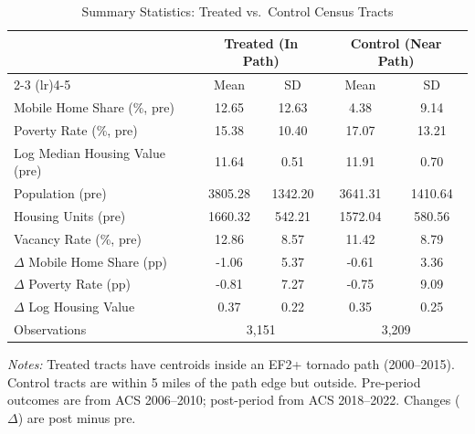 \begin{table}[t]
\centering
\caption{Summary Statistics: Treated vs.\ Control Census Tracts}
\label{tab:summary}
\begin{tabular}{lcccc}
\hline\hline
 & \multicolumn{2}{c}{Treated (In Path)} & \multicolumn{2}{c}{Control (Near Path)} \\
\cmidrule(lr){2-3} \cmidrule(lr){4-5}
 & Mean & SD & Mean & SD \\
\hline
Mobile Home Share (\%, pre) & 12.65 & 12.63 & 4.38 & 9.14 \\
Poverty Rate (\%, pre) & 15.38 & 10.40 & 17.07 & 13.21 \\
Log Median Housing Value (pre) & 11.64 & 0.51 & 11.91 & 0.70 \\
Population (pre) & 3805.28 & 1342.20 & 3641.31 & 1410.64 \\
Housing Units (pre) & 1660.32 & 542.21 & 1572.04 & 580.56 \\
Vacancy Rate (\%, pre) & 12.86 & 8.57 & 11.42 & 8.79 \\
$\Delta$ Mobile Home Share (pp) & -1.06 & 5.37 & -0.61 & 3.36 \\
$\Delta$ Poverty Rate (pp) & -0.81 & 7.27 & -0.75 & 9.09 \\
$\Delta$ Log Housing Value & 0.37 & 0.22 & 0.35 & 0.25 \\
\hline
Observations & \multicolumn{2}{c}{3,151} & \multicolumn{2}{c}{3,209} \\
\hline\hline
\end{tabular}
\vspace{0.3em}
\raggedright\footnotesize
\textit{Notes:} Treated tracts have centroids inside an EF2+ tornado path (2000--2015). Control tracts are within 5 miles of the path edge but outside. Pre-period outcomes are from ACS 2006--2010; post-period from ACS 2018--2022. Changes ($\Delta$) are post minus pre.
\end{table}
